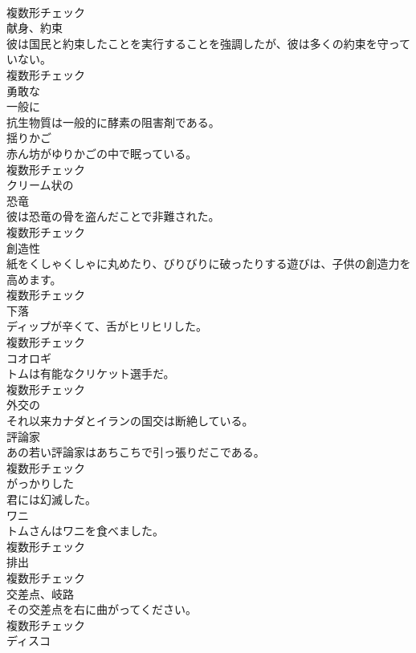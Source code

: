 \documentclass[8pt]{extreport}
\begin{document}
\begin{CJK}{UTF8}{min}
\\	複数形チェック
\\	[名詞]	献身、約束	
\\	彼は国民と約束したことを実行することを強調したが、彼は多くの約束を守っていない。	
\\	複数形チェック
\\	[形容詞]	勇敢な	
\\	[副詞]	一般に	
\\	抗生物質は一般的に酵素の阻害剤である。	
\\	[名詞]	揺りかご	
\\	赤ん坊がゆりかごの中で眠っている。	
\\	複数形チェック
\\	[形容詞]	クリーム状の	
\\	[名詞]	恐⻯	
\\	彼は恐竜の骨を盗んだことで非難された。	
\\	複数形チェック
\\	[名詞]	創造性	
\\	紙をくしゃくしゃに丸めたり、びりびりに破ったりする遊びは、子供の創造力を高めます。	
\\	複数形チェック
\\	[名詞]	下落	
\\	ディップが辛くて、舌がヒリヒリした。	
\\	複数形チェック
\\	[名詞]	コオロギ	
\\	トムは有能なクリケット選手だ。	
\\	複数形チェック
\\	[形容詞]	外交の	
\\	それ以来カナダとイランの国交は断絶している。	
\\	[名詞]	評論家	
\\	あの若い評論家はあちこちで引っ張りだこである。	
\\	複数形チェック
\\	[形容詞]	がっかりした	
\\	君には幻滅した。	
\\	[名詞]	ワニ	
\\	トムさんはワニを食べました。	
\\	複数形チェック
\\	[名詞]	排出	
\\	複数形チェック
\\	[名詞]	交差点、岐路	
\\	その交差点を右に曲がってください。	
\\	複数形チェック
\\	[名詞]	ディスコ	

\end{CJK}
\end{document}
